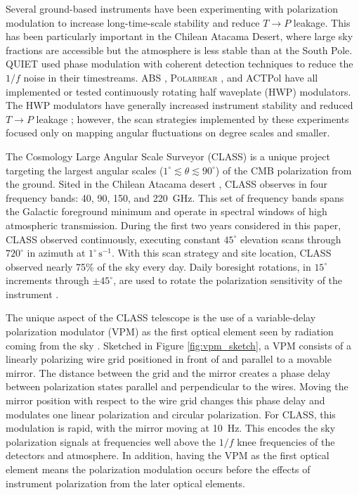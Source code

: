 \documentclass[twocolumn, tighten, numberedappendix, twocolappendix]{aastex63}
\begin{document}
Several ground-based instruments have been experimenting with polarization modulation to increase long-time-scale stability and reduce $T \rightarrow P$ leakage. This has been particularly important in the Chilean Atacama Desert, where large sky fractions are accessible but the atmosphere is less stable than at the South Pole. QUIET \citep{QUIET_results2011} used phase modulation with coherent detection techniques to reduce the $1/f$ noise in their timestreams. ABS \citep{abs_final}, \textsc{Polarbear} \citep{adac20}, and ACTPol \citep{loui17} have all implemented or tested continuously rotating half waveplate (HWP) modulators. The HWP modulators have generally increased instrument stability and reduced $T \rightarrow P$ leakage \citep{abs_hwp, Takakura2017}; however, the scan strategies implemented by these experiments focused only on mapping angular fluctuations on degree scales and smaller. 

The Cosmology Large Angular Scale Surveyor (CLASS) \citep{essi14, harr16} is a unique project targeting the largest angular scales ($1^\circ \lesssim \theta \lesssim 90^\circ$) of the CMB polarization from the ground. Sited in the Chilean Atacama desert \citep{parque_atacama}, CLASS observes in four frequency bands: 40, 90, 150, and 220~GHz. This set of frequency bands spans the Galactic foreground minimum and operate in spectral windows of high atmospheric transmission. During the first two years considered in this paper, CLASS observed continuously, executing constant $45^\circ$ elevation scans through $720^\circ$ in azimuth at $1^\circ\,\mathrm s^{-1}$. With this scan strategy and site location, CLASS observed nearly 75\% of the sky every day. Daily boresight rotations, in $15^\circ$ increments through $\pm45^\circ$, are used to rotate the polarization sensitivity of the instrument \citep{essi14}.

The unique aspect of the CLASS telescope is the use of a variable-delay polarization modulator (VPM) as the first optical element seen by radiation coming from the sky \citep{chus12, mill15, harr18}. Sketched in Figure \ref{fig:vpm_sketch}, a VPM consists of a linearly polarizing wire grid positioned in front of and parallel to a movable mirror. The distance between the grid and the mirror creates a phase delay between polarization states parallel and perpendicular to the wires. Moving the mirror position with respect to the wire grid changes this phase delay and modulates one linear polarization and circular polarization. For CLASS, this modulation is rapid, with the mirror moving at 10~Hz. This encodes the sky polarization signals at frequencies well above the $1/f$ knee frequencies of the detectors and atmosphere. In addition, having the VPM as the first optical element means the polarization modulation occurs before the effects of instrument polarization from the later optical elements. 
\end{document}
